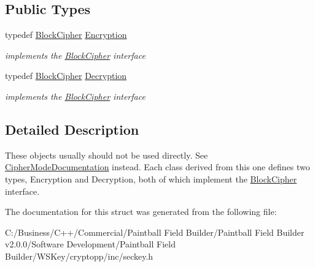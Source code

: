 \subsection*{Public Types}
\begin{DoxyCompactItemize}
\item 
\hypertarget{struct_block_cipher_documentation_a921359d125b6031a308179d32948b782}{
typedef \hyperlink{class_block_cipher}{BlockCipher} \hyperlink{struct_block_cipher_documentation_a921359d125b6031a308179d32948b782}{Encryption}}
\label{struct_block_cipher_documentation_a921359d125b6031a308179d32948b782}

\begin{DoxyCompactList}\small\item\em implements the \hyperlink{class_block_cipher}{BlockCipher} interface \item\end{DoxyCompactList}\item 
\hypertarget{struct_block_cipher_documentation_a71771ce405edecc9ff8a4788274a9147}{
typedef \hyperlink{class_block_cipher}{BlockCipher} \hyperlink{struct_block_cipher_documentation_a71771ce405edecc9ff8a4788274a9147}{Decryption}}
\label{struct_block_cipher_documentation_a71771ce405edecc9ff8a4788274a9147}

\begin{DoxyCompactList}\small\item\em implements the \hyperlink{class_block_cipher}{BlockCipher} interface \item\end{DoxyCompactList}\end{DoxyCompactItemize}


\subsection{Detailed Description}
These objects usually should not be used directly. See \hyperlink{struct_cipher_mode_documentation}{CipherModeDocumentation} instead. Each class derived from this one defines two types, Encryption and Decryption, both of which implement the \hyperlink{class_block_cipher}{BlockCipher} interface. 

The documentation for this struct was generated from the following file:\begin{DoxyCompactItemize}
\item 
C:/Business/C++/Commercial/Paintball Field Builder/Paintball Field Builder v2.0.0/Software Development/Paintball Field Builder/WSKey/cryptopp/inc/seckey.h\end{DoxyCompactItemize}
